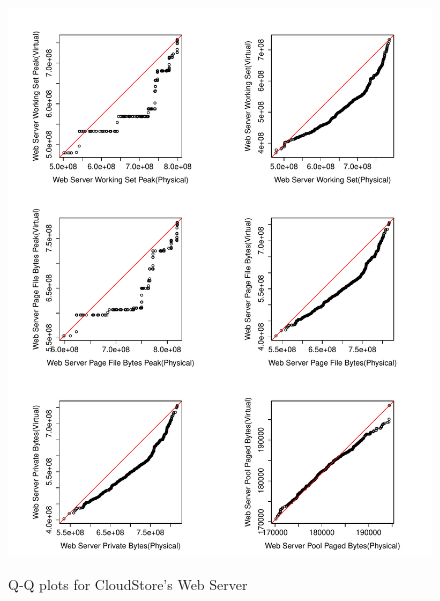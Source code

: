 \begin{figure}[tbh]
	\centering
	{\includegraphics[width=1.0\textwidth]{figures/appendix/qq_plots/CloudStore/Web_Server/Second_six.pdf}}
	\caption{Q-Q plots for CloudStore's Web Server}
\end{figure}

